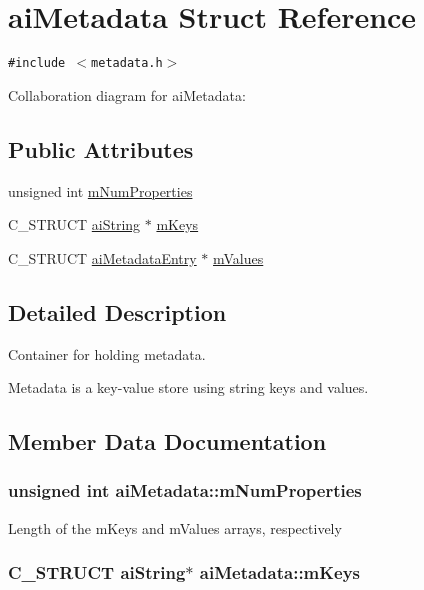 \hypertarget{structai_metadata}{
\section{aiMetadata Struct Reference}
\label{structai_metadata}
}
{\tt \#include $<$metadata.h$>$}

Collaboration diagram for aiMetadata:\subsection*{Public Attributes}
\begin{CompactItemize}
\item 
unsigned int \hyperlink{structai_metadata_32c4587c53dd402a5878ffc94088e528}{mNumProperties}
\item 
C\_\-STRUCT \hyperlink{structai_string}{aiString} $\ast$ \hyperlink{structai_metadata_a8c77a263443658737ee51a74e3c292e}{mKeys}
\item 
C\_\-STRUCT \hyperlink{structai_metadata_entry}{aiMetadataEntry} $\ast$ \hyperlink{structai_metadata_34b515fcb5b806c471d3c6ce7bc76beb}{mValues}
\end{CompactItemize}


\subsection{Detailed Description}
Container for holding metadata.

Metadata is a key-value store using string keys and values. 

\subsection{Member Data Documentation}
\hypertarget{structai_metadata_32c4587c53dd402a5878ffc94088e528}{
\subsubsection[mNumProperties]{\setlength{\rightskip}{0pt plus 5cm}unsigned int {\bf aiMetadata::mNumProperties}}}
\label{structai_metadata_32c4587c53dd402a5878ffc94088e528}


Length of the mKeys and mValues arrays, respectively \hypertarget{structai_metadata_a8c77a263443658737ee51a74e3c292e}{
\subsubsection[mKeys]{\setlength{\rightskip}{0pt plus 5cm}C\_\-STRUCT {\bf aiString}$\ast$ {\bf aiMetadata::mKeys}}}
\label{structai_metadata_a8c77a263443658737ee51a74e3c292e}


